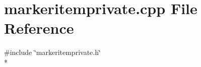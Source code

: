\section{markeritemprivate.\+cpp File Reference}
\label{items_2markeritemprivate_8cpp}
{\ttfamily \#include \char`\"{}markeritemprivate.\+h\char`\"{}}\\*
